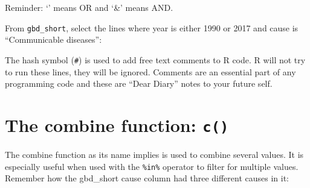 \documentclass[
  12pt,
  krantz2]{krantz}
\makeatletter
\newenvironment{Shaded}{\begin{snugshade}}{\end{snugshade}}
\newcommand{\CommentTok}[1]{\textcolor[rgb]{0.56,0.35,0.01}{\textit{#1}}}
\newcommand{\DecValTok}[1]{\textcolor[rgb]{0.00,0.00,0.81}{#1}}
\newcommand{\KeywordTok}[1]{\textcolor[rgb]{0.13,0.29,0.53}{\textbf{#1}}}
\newcommand{\NormalTok}[1]{#1}
\newcommand{\OperatorTok}[1]{\textcolor[rgb]{0.81,0.36,0.00}{\textbf{#1}}}
\newcommand{\StringTok}[1]{\textcolor[rgb]{0.31,0.60,0.02}{#1}}
\newenvironment{kframe}{%
\medskip{}
\setlength{\fboxsep}{.8em}
 \def\at@end@of@kframe{}%
 \ifinner\ifhmode%
  \def\at@end@of@kframe{\end{minipage}}%
  \begin{minipage}{\columnwidth}%
 \fi\fi%
 \def\FrameCommand##1{\hskip\@totalleftmargin \hskip-\fboxsep
 \colorbox{shadecolor}{##1}\hskip-\fboxsep
     \hskip-\linewidth \hskip-\@totalleftmargin \hskip\columnwidth}%
 \MakeFramed {\advance\hsize-\width
   \@totalleftmargin\z@ \linewidth\hsize
   \@setminipage}}%
 {\par\unskip\endMakeFramed%
 \at@end@of@kframe}
\renewenvironment{Shaded}{\begin{kframe}}{\end{kframe}}
\makeatother
\begin{document}
Reminder: `\textbar{}' means OR and `\&' means AND.

From \texttt{gbd\_short}, select the lines where year is either 1990 or 2017 and cause is ``Communicable diseases'':

\begin{Shaded}
\end{Shaded}

The hash symbol (\texttt{\#}) is used to add free text comments to R code.
R will not try to run these lines, they will be ignored.
Comments are an essential part of any programming code and these are ``Dear Diary'' notes to your future self.

\hypertarget{the-combine-function-c}{%
\section{\texorpdfstring{The combine function: \texttt{c()}}{The combine function: c()}}\label{the-combine-function-c}}


The combine function as its name implies is used to combine several values.
It is especially useful when used with the \texttt{\%in\%} operator to filter for multiple values.
Remember how the gbd\_short cause column had three different causes in it:
\end{document}
